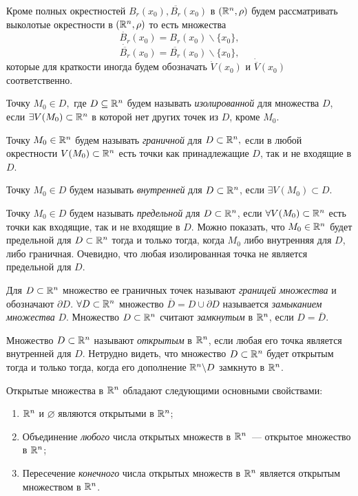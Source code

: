 \documentclass[../../main.tex]{subfiles}
\begin{document}
  \begin{rem}
    Кроме полных окрестностей $B_r(x_0), \overline{B_r}(x_0)$ в $
    (\mathbb{R}^n, \rho)$ будем рассматривать выколотые окрестности в $
    (\mathbb{R}^n, \rho)$ то есть множества
    \[
      \dot{B_r}(x_0) = B_r(x_0) \backslash \{x_0\},
    \]
    \[
      \dot{\overline{B_r}}(x_0) = \overline{B_r}(x_0) \backslash \{x_0\},
    \]
    которые для краткости иногда будем обозначать $\dot{V}(x_0) $ и 
    $\dot{\overline{V}}(x_0)$ соответственно. 
  \end{rem}
  \smallskip
  
  Точку $M_0 \in D,$ где $D \subseteq \mathbb{R}^n$ будем называть 
  \emph{изолированной} для множества $D$, если $\exists V(M_0) \subset 
  \mathbb{R}^n$ в которой нет других точек из $D$, кроме $M_0$.
  
  Точку $M_0 \in \mathbb{R}^n$ будем называть \emph{граничной} для $D \subset \mathbb{R}^n,
  $ если в любой окрестности $V(M_0) \subset \mathbb{R}^n$ есть точки как 
  принадлежащие $D$, так и не входящие в $D$.
  
  Точку $M_0 \in D$ будем называть \emph{внутренней} для $D \subset \mathbb{R}^n$, 
  если $\exists V(M_0) \subset D$.
  
  Точку $M_0 \in D$ будем называть \emph{предельной} для $D \subset \mathbb{R}^n$, 
  если $\forall V(M_0) \subset \mathbb{R}^n$ есть точки как входящие, так и 
  не входящие в $D$.
  Можно показать, что $M_0 \in \mathbb{R}^n$ будет предельной для $D \subset 
  \mathbb{R}^n$ тогда и только тогда, когда $M_0$ либо внутренняя для $D$, 
  либо граничная.
  Очевидно, что любая изолированная точка не является предельной для 
  $D$.
  
  Для $D \subset \mathbb{R}^n$ множество ее граничных точек называют 
  \emph{границей множества} и обозначают $\partial D$. 
  $\forall D \subset \mathbb{R}^n$ множество $\overline D = D \cup \partial D$ 
  называется \emph{замыканием множества} $D$. 
  Множество $D \subset \mathbb{R}^n$ считают \emph{замкнутым} в $\mathbb{R}^n$, если  $D = \overline 
  D$.
  
  Множество $D \subset \mathbb{R}^n$ называют \emph{открытым} в $\mathbb{R}^n$, если любая 
  его точка является внутренней для $D$. Нетрудно видеть, что 
  множество $D \subset \mathbb{R}^n$ будет открытым тогда и только тогда, 
  когда его дополнение $\mathbb{R}^n \backslash D$ замкнуто в $\mathbb{R}^n$. 
  
  \smallskip
  Открытые множества в $\mathbb{R}^n$ обладают следующими основными 
  свойствами:
  \begin{enumerate}
    \item
     $\mathbb{R}^n$  и $\varnothing$ являются открытыми в $\mathbb{R}^n$; 
     \item
      Объединение \emph{любого} числа открытых множеств в $\mathbb{R}^n$~--- 
      открытое множество в $\mathbb{R}^n$; 
      \item Пересечение \emph{конечного} числа открытых множеств в 
      $\mathbb{R}^n$ является открытым множеством в $\mathbb{R}^n$.
  \end{enumerate}  
\end{document}
